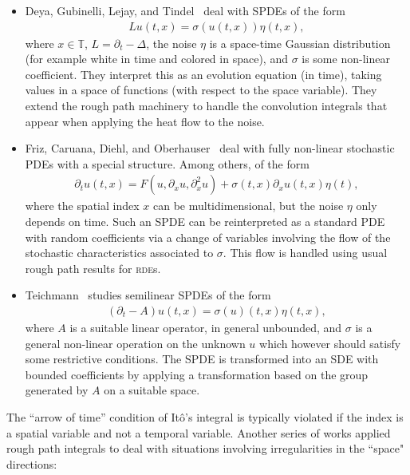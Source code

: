 \documentclass[11pt,a4paper]{article}
\theoremstyle{remark}
\begin{document}
\begin{itemize}
\item[--]
Deya, Gubinelli, Lejay, and Tindel~\cite{Gubinelli2006,Gubinelli2012a,Deya2012} deal with SPDEs of the form
\begin{align*}
   L u (t, x) = \sigma ( u ( t, x ) ) \eta ( t,x),
\end{align*}
where $x \in \mathbb{T}$, $L = \partial_t - \Delta$, the noise $\eta$ is a space-time Gaussian distribution (for example white in time and colored in space), and $\sigma$ is some non-linear coefficient. They interpret this as an evolution equation (in time), taking values in a space of functions (with respect to the space variable). They extend the rough path machinery to handle the convolution integrals that appear when applying the heat flow to the noise.

\item[--]
Friz, Caruana, Diehl, and Oberhauser~\cite{Caruana2009,Caruana2011,Friz2011b,Diehl2012} deal with fully non-linear stochastic PDEs with a special structure. Among others, of the form
\begin{align*}
   \partial_t u ( t, x ) = F ( u, \partial_{x} u, \partial_{x}^2 u) + \sigma( t, x) \partial_{x} u( t, x) \eta(t),
\end{align*}
where the spatial index $x$ can be multidimensional, but the noise $\eta$ only depends on time. Such an SPDE can be reinterpreted as a standard PDE with random coefficients via a change of variables involving the flow of the stochastic characteristics associated to $\sigma$. This flow is handled using usual rough path results for \textsc{rde}s.

\item[--]
Teichmann~\cite{Teichmann2011} studies semilinear SPDEs of the form
\begin{align*}
   (\partial_t - A) u(t,x) = \sigma(u)(t,x) \eta(t,x),
\end{align*}
where $A$ is a suitable linear operator, in general unbounded, and $\sigma$ is a general non-linear operation on the unknown $u$ which however should satisfy some restrictive conditions. The SPDE is transformed into an SDE with bounded coefficients by applying a  transformation based on the group generated by $A$ on a suitable space.
\end{itemize}

The ``arrow of time'' condition of It\^o's integral is typically violated if the index is a spatial variable and not a temporal variable. Another series of works applied rough path integrals to deal with situations involving irregularities in the ``space" directions:
\end{document}
